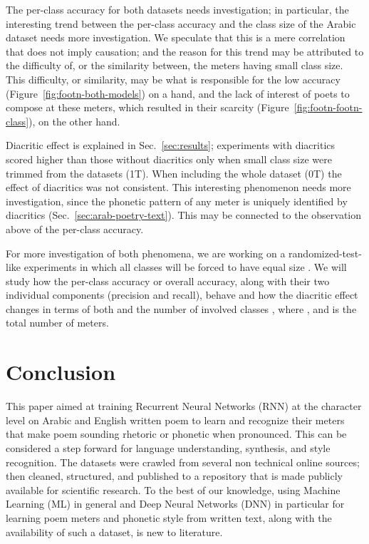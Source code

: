 \documentclass[journal,10pt,twocolumns,letter]{IEEEtran}
\begin{document}
\bigskip

The per-class accuracy for both datasets needs investigation; in particular, the interesting trend
between the per-class accuracy and the class size of the Arabic dataset needs more investigation. We
speculate that this is a mere correlation that does not imply causation; and the reason for this
trend may be attributed to the difficulty of, or the similarity between, the meters having small
class size. This difficulty, or similarity, may be what is responsible for the low accuracy
(Figure~\ref{fig:footn-both-models}) on a hand, and the lack of interest of poets to compose at
these meters, which resulted in their scarcity (Figure~\ref{fig:footn-footn-class}), on the other
hand.

Diacritic effect is explained in Sec.~\ref{sec:results}; experiments with diacritics scored higher
than those without diacritics only when small class size were trimmed from the datasets (1T). When
including the whole dataset (0T) the effect of diacritics was not consistent. This interesting
phenomenon needs more investigation, since the phonetic pattern of any meter is uniquely identified
by diacritics (Sec.~\ref{sec:arab-poetry-text}). This may be connected to the observation above of
the per-class accuracy.


For more investigation of both phenomena, we are working on a randomized-test-like experiments in
which all classes will be forced to have equal size . We will study how the per-class accuracy or
overall accuracy, along with their two individual components (precision and recall), behave and how
the diacritic effect changes in terms of both  and the number of involved classes , where
, and  is the total number of meters.







\section{Conclusion}\label{sec:conclusion}
This paper aimed at training Recurrent Neural Networks (RNN) at the character level on Arabic and
English written poem to learn and recognize their meters that make poem sounding rhetoric or
phonetic when pronounced. This can be considered a step forward for language understanding,
synthesis, and style recognition. The datasets were crawled from several non technical online
sources; then cleaned, structured, and published to a repository that is made publicly available for
scientific research. To the best of our knowledge, using Machine Learning (ML) in general and Deep
Neural Networks (DNN) in particular for learning poem meters and phonetic style from written text,
along with the availability of such a dataset, is new to literature.
\end{document}
